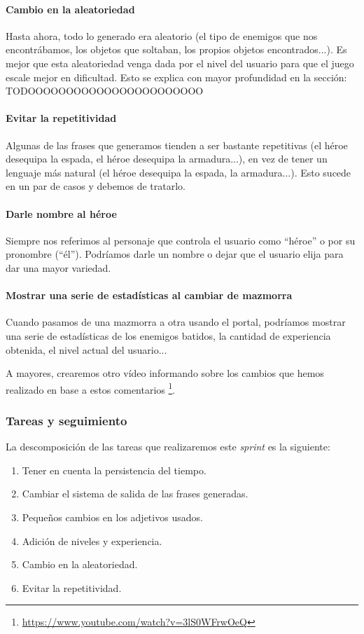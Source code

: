 \paragraph{Cambio en la aleatoriedad} Hasta ahora, todo lo generado era aleatorio (el tipo de enemigos que nos encontrábamos, los objetos que soltaban, los propios objetos encontrados...). Es mejor que esta aleatoriedad venga dada por el nivel del usuario para que el juego escale mejor en dificultad. Esto se explica con mayor profundidad en la sección: TODOOOOOOOOOOOOOOOOOOOOOOO

\paragraph{Evitar la repetitividad} Algunas de las frases que generamos tienden a ser bastante repetitivas (el héroe desequipa la espada, el héroe desequipa la armadura...), en vez de tener un lenguaje más natural (el héroe desequipa la espada, la armadura...). Esto sucede en un par de casos y debemos de tratarlo.

\paragraph{Darle nombre al héroe} Siempre nos referimos al personaje que controla el usuario como ``héroe'' o por su pronombre (``él''). Podríamos darle un nombre o dejar que el usuario elija para dar una mayor variedad.

\paragraph{Mostrar una serie de estadísticas al cambiar de mazmorra} Cuando pasamos de una mazmorra a otra usando el portal, podríamos mostrar una serie de estadísticas de los enemigos batidos, la cantidad de experiencia obtenida, el nivel actual del usuario...

A mayores, crearemos otro vídeo informando sobre los cambios que hemos realizado en base a estos comentarios \footnote{\url{https://www.youtube.com/watch?v=3lS0WFrwOeQ}}.

\subsubsection{Tareas y seguimiento}

La descomposición de las tareas que realizaremos este \textit{sprint} es la siguiente:

\begin{enumerate}[label=\bfseries WBS 8.\arabic*]
  \item Tener en cuenta la persistencia del tiempo.
  \item Cambiar el sistema de salida de las frases generadas.
  \item Pequeños cambios en los adjetivos usados.
  \item Adición de niveles y experiencia.
  \item Cambio en la aleatoriedad.
  \item Evitar la repetitividad.
\end{enumerate}


